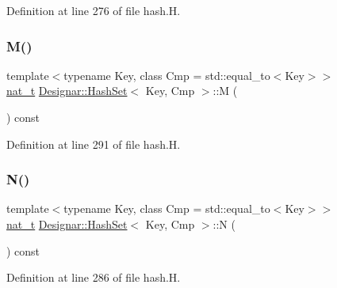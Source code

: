 Definition at line 276 of file hash.\+H.

\mbox{\label{class_designar_1_1_hash_set_ab77d2d3a6ce83395b35b9cdbbcf18c2b}} 
\subsubsection{\texorpdfstring{M()}{M()}}
{\footnotesize\ttfamily template$<$typename Key, class Cmp = std\+::equal\+\_\+to$<$\+Key$>$$>$ \\
\hyperlink{namespace_designar_aa72662848b9f4815e7bf31a7cf3e33d1}{nat\+\_\+t} \hyperlink{class_designar_1_1_hash_set}{Designar\+::\+Hash\+Set}$<$ Key, Cmp $>$\+::M (\begin{DoxyParamCaption}{ }\end{DoxyParamCaption}) const\hspace{0.3cm}{\ttfamily [inline]}}



Definition at line 291 of file hash.\+H.

\mbox{\label{class_designar_1_1_hash_set_a37cc23bf083078151f6f55b479c213ae}} 
\subsubsection{\texorpdfstring{N()}{N()}}
{\footnotesize\ttfamily template$<$typename Key, class Cmp = std\+::equal\+\_\+to$<$\+Key$>$$>$ \\
\hyperlink{namespace_designar_aa72662848b9f4815e7bf31a7cf3e33d1}{nat\+\_\+t} \hyperlink{class_designar_1_1_hash_set}{Designar\+::\+Hash\+Set}$<$ Key, Cmp $>$\+::N (\begin{DoxyParamCaption}{ }\end{DoxyParamCaption}) const\hspace{0.3cm}{\ttfamily [inline]}}



Definition at line 286 of file hash.\+H.

\mbox{\label{class_designar_1_1_hash_set_aed1240e62fdb7745bc9d7a123aa6da6a}} 

